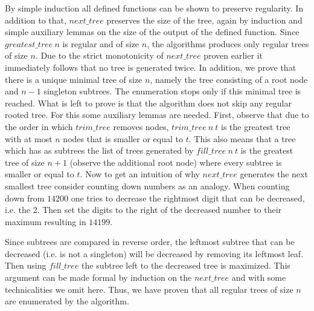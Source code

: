 By simple induction all defined functions can be shown to preserve regularity. In addition to that, $next\_tree$ preserves the size of the tree, again by induction and simple auxiliary lemmas on the size of the output of the defined function.
Since $greatest\_tree\ n$ is regular and of size $n$, the algorithms produces only regular trees of size $n$.
Due to the strict monotonicity of $next\_tree$ proven earlier it immediately follows that no tree is generated twice.
In addition, we prove that there is a unique minimal tree of size $n$, namely the tree consisting of a root node and $n-1$ singleton subtrees.
The enumeration stops only if this minimal tree is reached.
What is left to prove is that the algorithm does not skip any regular rooted tree.
For this some auxiliary lemmas are needed.
First, observe that due to the order in which $trim\_tree$ removes nodes, $trim\_tree\ n\ t$ is the greatest tree with at most $n$ nodes that is smaller or equal to $t$.
This also means that a tree which has as subtrees the list of trees generated by $fill\_tree\ n\ t$ is the greatest tree of size $n + 1$ (observe the additional root node) where every subtree is smaller or equal to $t$.
Now to get an intuition of why $next\_tree$ generates the next smallest tree consider counting down numbers as an analogy.
When counting down from $14200$ one tries to decrease the rightmost digit that can be decreased, i.e. the 2.
Then set the digits to the right of the decreased number to their maximum resulting in $14199$.

Since subtrees are compared in reverse order, the leftmost subtree that can be decreased (i.e. is not a singleton) will be decreased by removing its leftmost leaf.
Then using $fill\_tree$ the subtree left to the decreased tree is maximized.
This argument can be made formal by induction on the $next\_tree$ and with some technicalities we omit here.
Thus, we have proven that all regular trees of size $n$ are enumerated by the algorithm.

